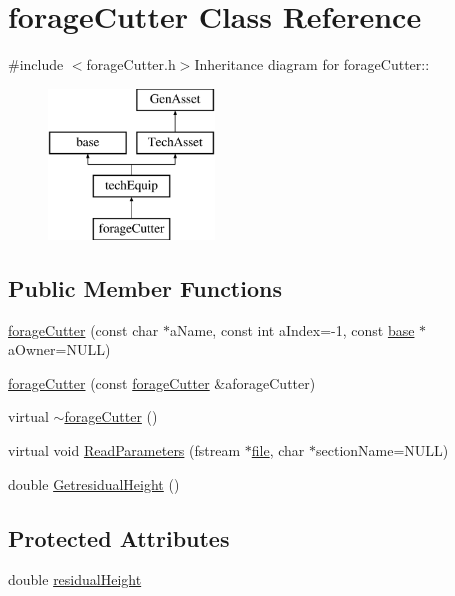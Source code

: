 \hypertarget{classforage_cutter}{
\section{forageCutter Class Reference}
\label{classforage_cutter}
}


{\ttfamily \#include $<$forageCutter.h$>$}Inheritance diagram for forageCutter::\begin{figure}[H]
\begin{center}
\leavevmode
\includegraphics[height=4cm]{classforage_cutter}
\end{center}
\end{figure}
\subsection*{Public Member Functions}
\begin{DoxyCompactItemize}
\item 
\hyperlink{classforage_cutter_a3ff5641ceb26a09f971374a5ff796c9f}{forageCutter} (const char $\ast$aName, const int aIndex=-\/1, const \hyperlink{classbase}{base} $\ast$aOwner=NULL)
\item 
\hyperlink{classforage_cutter_a94984cb2375bcad4ff28b311233ef803}{forageCutter} (const \hyperlink{classforage_cutter}{forageCutter} \&aforageCutter)
\item 
virtual \hyperlink{classforage_cutter_a8c5e3bc21fd8db95c681c8f9e81cb25b}{$\sim$forageCutter} ()
\item 
virtual void \hyperlink{classforage_cutter_af767727457025f83e708de8838a7beed}{ReadParameters} (fstream $\ast$\hyperlink{classbase_a3af52ee9891719d09b8b19b42450b6f6}{file}, char $\ast$sectionName=NULL)
\item 
double \hyperlink{classforage_cutter_a706720eb490008cdf8f154a348bdf82a}{GetresidualHeight} ()
\end{DoxyCompactItemize}
\subsection*{Protected Attributes}
\begin{DoxyCompactItemize}
\item 
double \hyperlink{classforage_cutter_a80ba26c9181973df976c006c66d1eb54}{residualHeight}
\end{DoxyCompactItemize}


